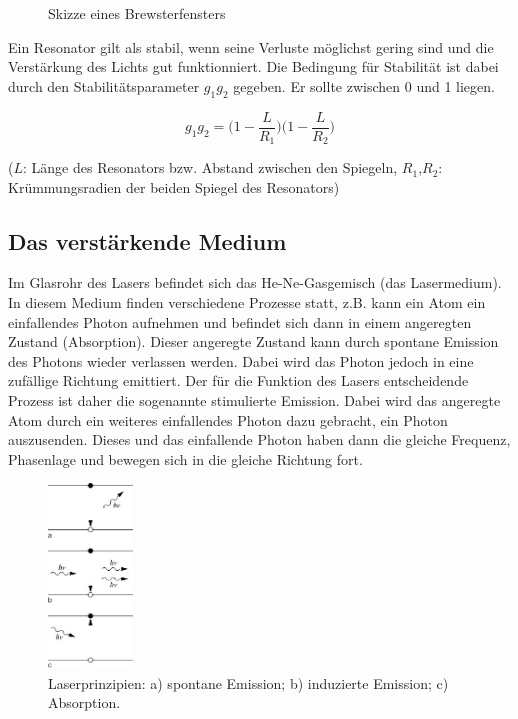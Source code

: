 \begin{figure}[H]
  \centering
  \caption{Skizze eines Brewsterfensters}
  \label{fig:Brewsterfenster}
\end{figure}

Ein Resonator gilt als stabil, wenn seine Verluste möglichst gering sind und die Verstärkung des Lichts gut funktionniert.
Die Bedingung für Stabilität ist dabei durch den Stabilitätsparameter $g_1g_2$ gegeben. Er sollte zwischen 0 und 1 liegen.

\begin{equation}
  g_1g_2 = \biggl(1-\frac{L}{R_1}\biggr)\biggl(1-\frac{L}{R_2}\biggr)
\end{equation}

($L$: Länge des Resonators bzw. Abstand zwischen den Spiegeln, $R_1$,$R_2$: Krümmungsradien der beiden Spiegel des Resonators)

\subsection{Das verstärkende Medium}

Im Glasrohr des Lasers befindet sich das He-Ne-Gasgemisch (das Lasermedium). In diesem Medium finden verschiedene Prozesse
statt, z.B. kann ein Atom ein einfallendes Photon aufnehmen und befindet sich dann in einem angeregten Zustand (Absorption).
Dieser angeregte Zustand kann durch spontane Emission des Photons wieder verlassen werden. Dabei wird das Photon jedoch
in eine zufällige Richtung emittiert. Der für die Funktion des Lasers entscheidende Prozess ist daher die sogenannte stimulierte
Emission. Dabei wird das angeregte Atom durch ein weiteres einfallendes Photon dazu gebracht, ein Photon auszusenden.
Dieses und das einfallende Photon haben dann die gleiche Frequenz, Phasenlage und bewegen sich in die gleiche Richtung fort.

\begin{figure}
\centering
\includegraphics[width=0.2\textwidth]{emission.jpg}
\caption{Laserprinzipien: a) spontane Emission; b) induzierte Emission; c) Absorption.\cite{spektrum}}
\label{fig:emission}
\end{figure}

